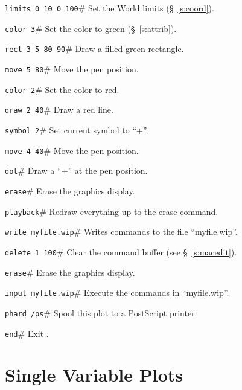 \begin{wiplist}%
  \item {\tt limits 0 10 0 100}\hfill\# Set the World limits (\S~\ref{s:coord}).
\samepage
  \item {\tt color 3}\hfill\# Set the color to green (\S~\ref{s:attrib}).
  \item {\tt rect 3 5 80 90}\hfill\# Draw a filled green rectangle.
  \item {\tt move 5 80}\hfill\# Move the pen position.
  \item {\tt color 2}\hfill\# Set the color to red.
  \item {\tt draw 2 40}\hfill\# Draw a red line.
  \item {\tt symbol 2}\hfill\# Set current symbol to ``+''.
  \item {\tt move 4 40}\hfill\# Move the pen position.
  \item {\tt dot}\hfill\# Draw a ``+'' at the pen position.
  \item {\tt erase}\hfill\# Erase the graphics display.
  \item {\tt playback}\hfill\# Redraw everything up to the erase command.
  \item {\tt write myfile.wip}\hfill\# Writes commands to the file ``myfile.wip''.
  \item {\tt delete 1 100}\hfill\# Clear the command buffer
    (see \S~\ref{s:macedit}).
  \item {\tt erase}\hfill\# Erase the graphics display.
  \item {\tt input myfile.wip}\hfill\# Execute the commands in ``myfile.wip''.
  \item {\tt phard /ps}\hfill\# Spool this plot to a PostScript printer.
  \item {\tt end}\hfill\# Exit \wip.
\end{wiplist}
\section               {Single Variable Plots}

